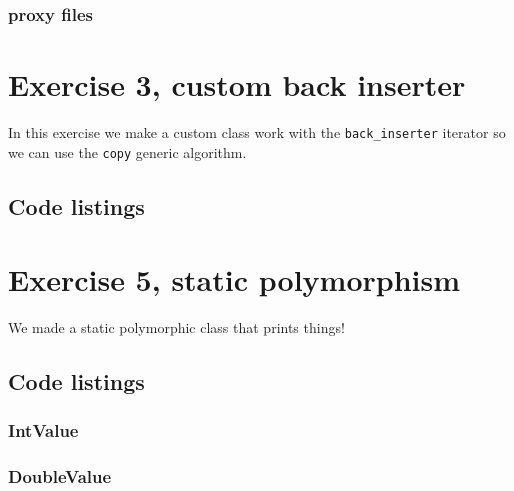 \documentclass[11pt]{article}
\begin{document}
\subsubsection*{proxy files}





\section*{Exercise 3, custom back inserter}
In this exercise we make a custom class work with the \texttt{back\_inserter} iterator so we can use the \texttt{copy} generic algorithm.

\subsection*{Code listings}





\section*{Exercise 5, static polymorphism}
We made a static polymorphic class that prints things!

\subsection*{Code listings}






\subsubsection*{IntValue}



\subsubsection*{DoubleValue}


\end{document}

